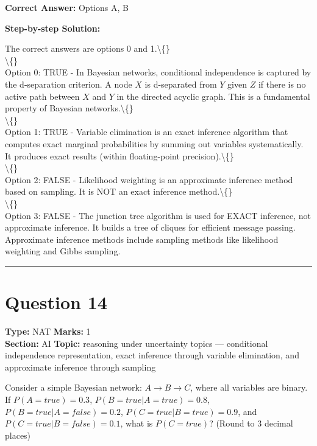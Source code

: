 \documentclass[11pt]{article}
\begin{document}
\textbf{Correct Answer:} Options A, B

\textbf{Step-by-step Solution:}

The correct answers are options 0 and 1.\textbackslash\{\}\\
\textbackslash\{\}\\
Option 0: TRUE - In Bayesian networks, conditional independence is captured by the d-separation criterion. A node \(X\) is d-separated from \(Y\) given \(Z\) if there is no active path between \(X\) and \(Y\) in the directed acyclic graph. This is a fundamental property of Bayesian networks.\textbackslash\{\}\\
\textbackslash\{\}\\
Option 1: TRUE - Variable elimination is an exact inference algorithm that computes exact marginal probabilities by summing out variables systematically. It produces exact results (within floating-point precision).\textbackslash\{\}\\
\textbackslash\{\}\\
Option 2: FALSE - Likelihood weighting is an approximate inference method based on sampling. It is NOT an exact inference method.\textbackslash\{\}\\
\textbackslash\{\}\\
Option 3: FALSE - The junction tree algorithm is used for EXACT inference, not approximate inference. It builds a tree of cliques for efficient message passing. Approximate inference methods include sampling methods like likelihood weighting and Gibbs sampling.

\vspace{0.8em}
\hrule
\vspace{0.4em}
\section*{Question 14}
\textbf{Type:} NAT \hfill \textbf{Marks:} 1\\
\textbf{Section:} AI \hfill \textbf{Topic:} reasoning under uncertainty topics — conditional independence representation, exact inference through variable elimination, and approximate inference through sampling

Consider a simple Bayesian network: \(A \rightarrow B \rightarrow C\), where all variables are binary. If \(P(A = true) = 0.3\), \(P(B = true | A = true) = 0.8\), \(P(B = true | A = false) = 0.2\), \(P(C = true | B = true) = 0.9\), and \(P(C = true | B = false) = 0.1\), what is \(P(C = true)\)? (Round to 3 decimal places)
\end{document}
